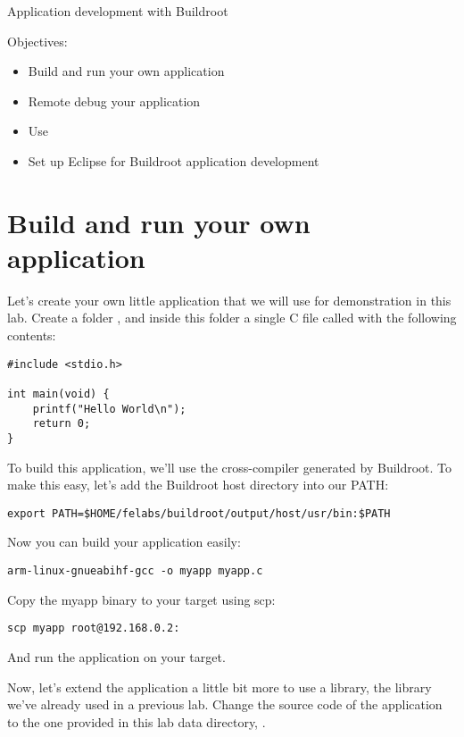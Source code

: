 \subchapter
{Application development with Buildroot}
{Objectives:
  \begin{itemize}
  \item Build and run your own application
  \item Remote debug your application
  \item Use 
  \item Set up Eclipse for Buildroot application development
  \end{itemize}
}

\section{Build and run your own application}

Let's create your own little application that we will use for
demonstration in this lab. Create a folder ,
and inside this folder a single C file called  with the
following contents:

\begin{verbatim}
#include <stdio.h>

int main(void) {
	printf("Hello World\n");
	return 0;
}
\end{verbatim}

To build this application, we'll use the cross-compiler generated by
Buildroot. To make this easy, let's add the Buildroot host directory
into our PATH:

\begin{verbatim}
export PATH=$HOME/felabs/buildroot/output/host/usr/bin:$PATH
\end{verbatim}

Now you can build your application easily:

\begin{verbatim}
arm-linux-gnueabihf-gcc -o myapp myapp.c
\end{verbatim}

Copy the myapp binary to your target using scp:

\begin{verbatim}
scp myapp root@192.168.0.2:
\end{verbatim}

And run the  application on your target.

Now, let's extend the application a little bit more to use a library,
the  library we've already used in a previous
lab. Change the source code of the application to the one provided in
this lab data directory, .

